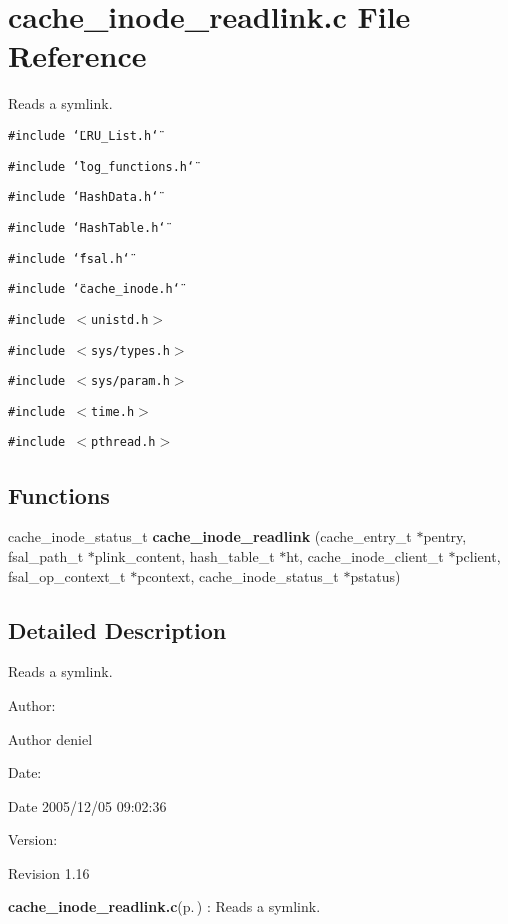\section{cache\_\-inode\_\-readlink.c File Reference}
\label{cache__inode__readlink_8c}
Reads a symlink. 

{\tt \#include \char`\"{}LRU\_\-List.h\char`\"{}}\par
{\tt \#include \char`\"{}log\_\-functions.h\char`\"{}}\par
{\tt \#include \char`\"{}Hash\-Data.h\char`\"{}}\par
{\tt \#include \char`\"{}Hash\-Table.h\char`\"{}}\par
{\tt \#include \char`\"{}fsal.h\char`\"{}}\par
{\tt \#include \char`\"{}cache\_\-inode.h\char`\"{}}\par
{\tt \#include $<$unistd.h$>$}\par
{\tt \#include $<$sys/types.h$>$}\par
{\tt \#include $<$sys/param.h$>$}\par
{\tt \#include $<$time.h$>$}\par
{\tt \#include $<$pthread.h$>$}\par
\subsection*{Functions}
\begin{CompactItemize}
\item 
cache\_\-inode\_\-status\_\-t {\bf cache\_\-inode\_\-readlink} (cache\_\-entry\_\-t $\ast$pentry, fsal\_\-path\_\-t $\ast$plink\_\-content, hash\_\-table\_\-t $\ast$ht, cache\_\-inode\_\-client\_\-t $\ast$pclient, fsal\_\-op\_\-context\_\-t $\ast$pcontext, cache\_\-inode\_\-status\_\-t $\ast$pstatus)
\end{CompactItemize}


\subsection{Detailed Description}
Reads a symlink. 

\begin{Desc}
\item[Author:]\begin{Desc}
\item[Author]deniel \end{Desc}
\end{Desc}
\begin{Desc}
\item[Date:]\begin{Desc}
\item[Date]2005/12/05 09:02:36 \end{Desc}
\end{Desc}
\begin{Desc}
\item[Version:]\begin{Desc}
\item[Revision]1.16 \end{Desc}
\end{Desc}
{\bf cache\_\-inode\_\-readlink.c}{\rm (p.\,\pageref{cache__inode__readlink_8c})} : Reads a symlink.

